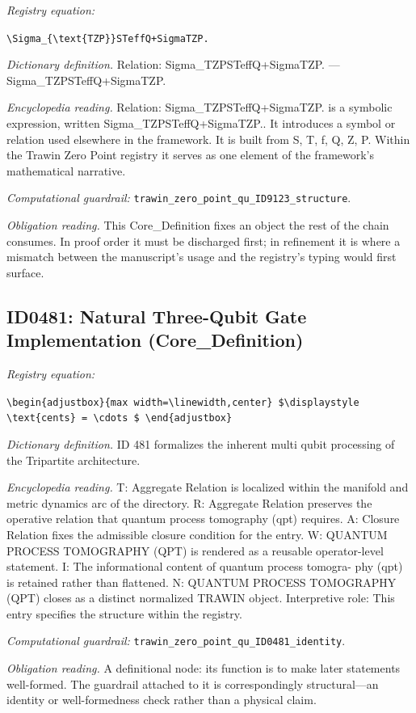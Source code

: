 \documentclass[11pt]{article}
\theoremstyle{remark}
\begin{document}
\noindent\textit{Registry equation:}\par
{\small\texttt{\textbackslash{}Sigma\_\{\textbackslash{}text\{TZP\}\}STeffQ+SigmaTZP.}}\par\medskip
\noindent\textit{Dictionary definition.} Relation: Sigma\_TZPSTeffQ+SigmaTZP. --- Sigma\_TZPSTeffQ+SigmaTZP.\par\medskip
\noindent\textit{Encyclopedia reading.} Relation: Sigma\_TZPSTeffQ+SigmaTZP. is a symbolic expression, written Sigma\_TZPSTeffQ+SigmaTZP.. It introduces a symbol or relation used elsewhere in the framework. It is built from S, T, f, Q, Z, P. Within the Trawin Zero Point registry it serves as one element of the framework's mathematical narrative.
\par\medskip\noindent\textit{Computational guardrail:} \texttt{trawin\_zero\_point\_qu\_ID9123\_structure}.
\par\medskip\noindent\textit{Obligation reading.} This Core\_Definition fixes an object the rest of the chain consumes. In proof order it must be discharged first; in refinement it is where a mismatch between the manuscript's usage and the registry's typing would first surface.

\subsection{ID0481: Natural Three-Qubit Gate Implementation (Core\_Definition)}

\noindent\textit{Registry equation:}\par
{\small\texttt{\textbackslash{}begin\{adjustbox\}\{max width=\textbackslash{}linewidth,center\} \$\textbackslash{}displaystyle \textbackslash{}text\{cents\} = \textbackslash{}cdots \$ \textbackslash{}end\{adjustbox\}}}\par\medskip
\noindent\textit{Dictionary definition.} ID 481 formalizes the inherent multi qubit processing of the Tripartite architecture.\par\medskip
\noindent\textit{Encyclopedia reading.} T: Aggregate Relation is localized within the manifold and metric dynamics arc of the directory. R: Aggregate Relation preserves the operative relation that quantum process tomography (qpt) requires. A: Closure Relation fixes the admissible closure condition for the entry. W: QUANTUM PROCESS TOMOGRAPHY (QPT) is rendered as a reusable operator-level statement. I: The informational content of quantum process tomogra- phy (qpt) is retained rather than flattened. N: QUANTUM PROCESS TOMOGRAPHY (QPT) closes as a distinct normalized TRAWIN object. Interpretive role: This entry specifies the structure within the registry.
\par\medskip\noindent\textit{Computational guardrail:} \texttt{trawin\_zero\_point\_qu\_ID0481\_identity}.
\par\medskip\noindent\textit{Obligation reading.} A definitional node: its function is to make later statements well-formed. The guardrail attached to it is correspondingly structural---an identity or well-formedness check rather than a physical claim.
\end{document}

